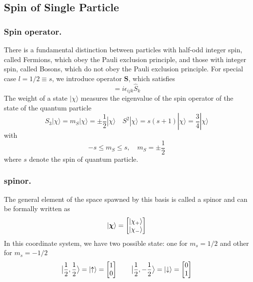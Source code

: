 \documentclass[../../../main.tex]{subfiles}
\begin{document}
\subsection{Spin of Single Particle}
\subsubsection{Spin operator.}
There is a fundamental distinction between particles with half-odd integer spin, called Fermions, which obey the Pauli exclusion principle, and those with integer spin, called Bosons, which do not obey the Pauli exclusion principle.
For special case $l=1/2\equiv s$, we introduce operator $\mathbf{S}$, which satisfies
\begin{equation*}
    [\hat{S}_{i}, \hat{S}_{j}] = i \epsilon_{ijk} \hat{S}_{k}
\end{equation*}
The weight of a state $|\chi\rangle$ measures the eigenvalue of the spin operator of the state of the quantum particle
\begin{equation*}
    S_3 |\chi\rangle = m_S |\chi\rangle = \pm \frac{1}{2} |\chi\rangle \quad
    S^2 |\chi\rangle = s(s + 1) |\chi\rangle = \frac{3}{4} |\chi\rangle
\end{equation*}
with
\begin{equation*}
    -s \leq m_S \leq s, \quad  m_S = \pm \frac{1}{2}
\end{equation*}
where $s$ denote the spin of quantum particle.

\subsubsection{spinor.}
The general element of the space spawned by this basis is called a spinor and can be formally written as
\begin{equation*}
    \ket{\boldsymbol{\chi}}= \begin{bmatrix}
        \ket{\chi_+} \\
        \ket{\chi_-}
    \end{bmatrix}
\end{equation*}
In this coordinate system, we have two possible state: one for $m_s=1/2$ and other for $m_s=-1/2$
\begin{equation*}
    \big| \frac{1 }{2 },\frac{1 }{2 }\big\rangle = \ket{\uparrow} = \begin{bmatrix} 1\\0 \end{bmatrix}\qquad
    \big| \frac{1 }{2 },-\frac{1 }{2 }\big\rangle = \ket{\downarrow} = \begin{bmatrix} 0\\1 \end{bmatrix}
\end{equation*}
\end{document}
